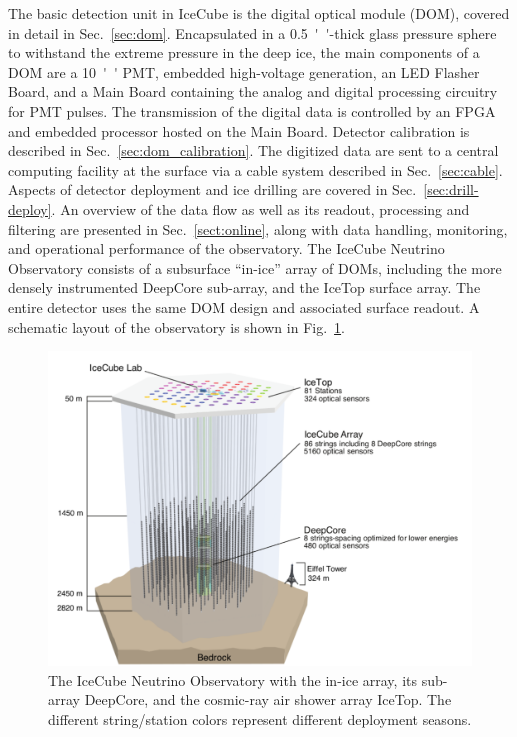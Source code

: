The basic detection unit in IceCube is the
digital optical module (DOM), covered in detail in Sec.~\ref{sec:dom}.
Encapsulated in a \SI{0.5}{''}-thick glass pressure sphere 
to withstand the extreme pressure in the deep ice, the main components of a DOM
are a \SI{10}{''} PMT, embedded high-voltage generation, an LED Flasher 
Board, and a Main Board containing the analog and digital processing circuitry
for PMT pulses.  The transmission of the digital data is controlled by an FPGA
and embedded processor hosted on the Main Board. Detector calibration
is described in Sec.~\ref{sec:dom_calibration}. The digitized data are sent to a
central computing facility at the surface via a cable system described in
Sec.~\ref{sec:cable}.  Aspects of detector deployment and ice drilling are
covered in Sec.~\ref{sec:drill-deploy}. An overview of the data flow as well as
its readout, processing and filtering are presented in
Sec.~\ref{sect:online}, along with data handling, monitoring, and operational performance of
the observatory. The IceCube Neutrino Observatory consists of a subsurface
``in-ice'' array of DOMs, including the more densely instrumented
DeepCore sub-array, and the IceTop surface array.  The entire detector
uses the same DOM design and associated surface readout. A schematic layout
of the observatory is shown in Fig.~\ref{fig:array}. 

\begin{figure}[!h]
 \centering
 \includegraphics[width=\textwidth]{graphics/intro/ArrayWSeasonsLabels_crop.pdf}
 \caption{The IceCube Neutrino Observatory with the in-ice array, its sub-array DeepCore, and
   the cosmic-ray air shower array IceTop. The different string/station colors
   represent different deployment seasons.}
 \label{fig:array}
\end{figure}

